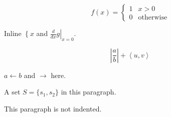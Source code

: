 \documentclass{article}
\begin{document}
\begin{equation*}
  f(x) = \left\{
    \begin{array}{ll}
      1 & x > 0 \\
      0 & \text{otherwise}
    \end{array}
  \right.
\end{equation*}

Inline $\left\{ x \right.$ and $\left. \frac{d}{dx} g \right|_{x=0}$.

\begin{equation*}
  \left|
    \frac{a}{b}
  \right|
  + \left\langle u,
  v \right\rangle
\end{equation*}

$a \leftarrow b$ and $\rightarrow$ here.

A set $S = \{s_1,
s_2\}$ in this paragraph.

This paragraph is not indented.
\end{document}

